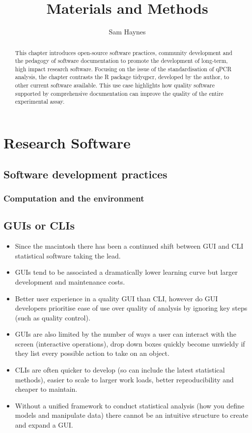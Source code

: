 \documentclass{SBCbookchapter}
\author{Sam Haynes}
\title{Materials and Methods}
\begin{document}
\maketitle

\begin{abstract}
This chapter introduces open-source software practices, community development and the pedagogy of software documentation to promote the development of long-term, high impact research software. Focusing on the issue of the standardisation of qPCR analysis, the chapter contrasts the R package tidyqpcr, developed by the author, to other current software available. This use case highlights how quality software supported by comprehensive documentation can improve the quality of the entire experimental assay.


\end{abstract}

\section{Research Software}

\subsection{Software development practices}

\subsubsection{Computation and the environment}

\subsection{GUIs or CLIs}

\begin{itemize}
    \item Since the macintosh there has been a continued shift between GUI and CLI statistical software taking the lead. 
    \item GUIs tend to be associated a dramatically lower learning curve but larger development and maintenance costs.
    \item Better user experience in a quality GUI than CLI, however do GUI developers prioritise ease of use over quality of analysis by ignoring key steps (such as quality control).
    \item GUIs are also limited by the number of ways a user can interact with the screen (interactive operations), drop down boxes quickly become unwieldy if they list every possible action to take on an object. 
    \item CLIs are often quicker to develop (so can include the latest statistical methods), easier to scale to larger work loads, better reproducibility and cheaper to maintain.
    \item Without a unified framework to conduct statistical analysis (how you define models and manipulate data) there cannot be an intuitive structure to create and expand a GUI.

\end{itemize}
\end{document}
